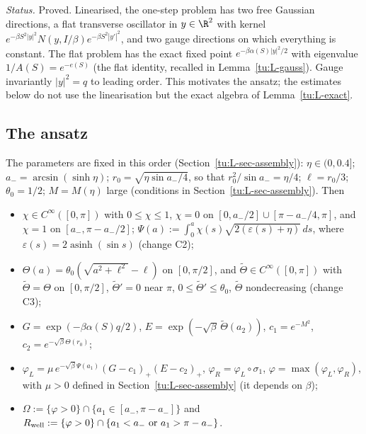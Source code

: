 \noindent\emph{Status.} Proved. Linearised, the one-step problem has two free Gaussian directions, a
flat transverse oscillator in $y\in\R^2$ with kernel $e^{-\beta S^2|y|^2}N(y,I/\beta)e^{-\beta S^2|y'|^2}$,
and two gauge directions on which everything is constant. The flat problem has the exact fixed point
$e^{-\beta\alpha(S)|y|^2/2}$ with eigenvalue $1/A(S)=e^{-e(S)}$ (the flat identity, recalled in
Lemma~\ref{tu:L-gauss}). Gauge invariantly $|y|^2=q$ to leading order. This motivates the ansatz; the
estimates below do not use the linearisation but the exact algebra of Lemma~\ref{tu:L-exact}.

\subsection{The ansatz}\label{tu:L-ansatz}

The parameters are fixed in this order (Section~\ref{tu:L-sec-assembly}): $\eta\in(0,0.4]$;
$a_-=\arcsin(\sinh\eta)$; $r_0=\sqrt{\eta\sin a_-/4}$, so that $r_0^2/\sin a_-=\eta/4$; $\ell=r_0/3$;
$\theta_0=1/2$; $M=M(\eta)$ large (conditions in Section~\ref{tu:L-sec-assembly}). Then
\begin{itemize}
\item $\chi\in C^\infty([0,\pi])$ with $0\le\chi\le1$, $\chi=0$ on $[0,a_-/2]\cup[\pi-a_-/4,\pi]$, and
$\chi=1$ on $[a_-,\pi-a_-/2]$; $\Psi(a):=\int_0^a\chi(s)\sqrt{2(\varepsilon(s)+\eta)}\,ds$, where
$\varepsilon(s)=2\operatorname{asinh}(\sin s)$ (change C2);
\item $\Theta(a)=\theta_0(\sqrt{a^2+\ell^2}-\ell)$ on $[0,\pi/2]$, and $\tilde\Theta\in C^\infty([0,\pi])$
with $\tilde\Theta=\Theta$ on $[0,\pi/2]$, $\tilde\Theta'=0$ near $\pi$, $0\le\tilde\Theta'\le\theta_0$,
$\tilde\Theta$ nondecreasing (change C3);
\item $G=\exp(-\beta\alpha(S)q/2)$, $E=\exp(-\sqrt\beta\,\tilde\Theta(a_2))$, $c_1=e^{-M^2}$,
$c_2=e^{-\sqrt\beta\Theta(r_0)}$;
\item $\varphi_L=\mu\,e^{-\sqrt\beta\Psi(a_1)}(G-c_1)_+(E-c_2)_+$, $\varphi_R=\varphi_L\circ\sigma_1$,
$\varphi=\max(\varphi_L,\varphi_R)$, with $\mu>0$ defined in Section~\ref{tu:L-sec-assembly} (it depends on $\beta$);
\item $\Omega:=\{\varphi>0\}\cap\{a_1\in[a_-,\pi-a_-]\}$ and
$R_{\rm well}:=\{\varphi>0\}\cap\{a_1<a_-\text{ or }a_1>\pi-a_-\}$.
\end{itemize}

